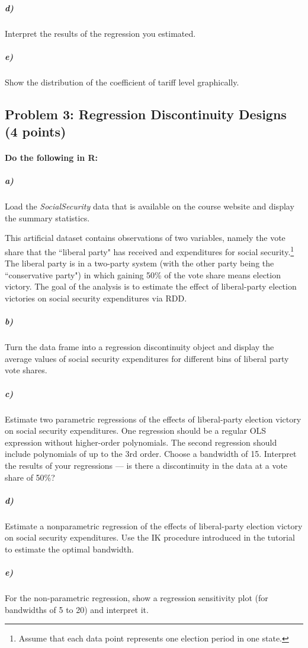 \documentclass[12pt]{article}
\begin{document}
\subparagraph{d)} Interpret the results of the regression you estimated.

\subparagraph{e)} Show the distribution of the coefficient of tariff level graphically.



\subsection*{Problem 3: Regression Discontinuity Designs (4 points)}

\paragraph{Do the following in R:}

\subparagraph{a)} Load the \textit{SocialSecurity} data that is available on the course website and display the summary statistics.

This artificial dataset contains observations of two variables, namely the vote share that the ``liberal party" has received and expenditures for social security.\footnote{Assume that each data point represents one election period in one state.} The liberal party is in a two-party system (with the other party being the ``conservative party") in which gaining 50\% of the vote share means election victory. The goal of the analysis is to estimate the effect of liberal-party election victories on social security expenditures via RDD.

\subparagraph{b)} Turn the data frame into a regression discontinuity object and display the average values of social security expenditures for different bins of liberal party vote shares.

\subparagraph{c)} Estimate two parametric regressions of the effects of liberal-party election victory on social security expenditures. One regression should be a regular OLS expression without higher-order polynomials. The second regression should include polynomials of up to the 3rd order. Choose a bandwidth of 15. Interpret the results of your regressions --- is there a discontinuity in the data at a vote share of 50\%?

\subparagraph{d)} Estimate a nonparametric regression of the effects of liberal-party election victory on social security expenditures. Use the IK procedure introduced in the tutorial to estimate the optimal bandwidth.

\subparagraph{e)} For the non-parametric regression, show a regression sensitivity plot (for bandwidths of 5 to 20) and interpret it.
\end{document}
